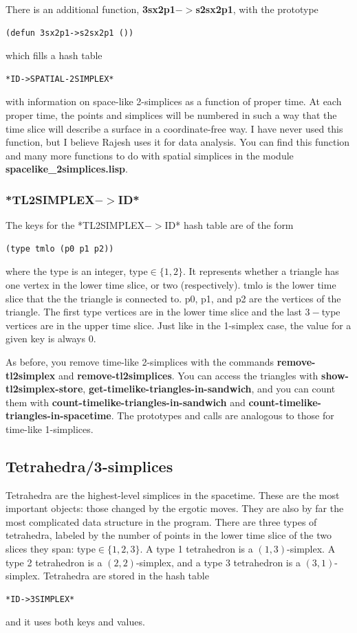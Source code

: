 \message{ !name(programmers_guide.tex)}\documentclass[12pt]{article}
\begin{document}
There is an additional function, \textbf{3sx2p1$->$s2sx2p1}, with the
prototype
\begin{lstlisting}
(defun 3sx2p1->s2sx2p1 ())
\end{lstlisting}
which fills a hash table
\begin{lstlisting}
*ID->SPATIAL-2SIMPLEX*
\end{lstlisting}
with information on space-like 2-simplices as a function of proper
time. At each proper time, the points and simplices will be numbered
in such a way that the time slice will describe a surface in a
coordinate-free way. I have never used this function, but I believe
Rajesh uses it for data analysis. You can find this function and many
more functions to do with spatial simplices in the module
\textbf{spacelike\_2simplices.lisp}.


\subsubsection{*TL2SIMPLEX$->$ID*}
The keys for the *TL2SIMPLEX$->$ID* hash table are of the form
\begin{lstlisting}
(type tmlo (p0 p1 p2))
\end{lstlisting}
where the type is an integer, type$\in\{1,2\}$. It represents whether
a triangle has one vertex in the lower time slice, or two
(respectively). tmlo is the lower time slice that the the triangle is
connected to. p0, p1, and p2 are the vertices of the triangle. The
first type vertices are in the lower time slice and the last $3-$type
vertices are in the upper time slice. Just like in the 1-simplex case,
the value for a given key is always 0.

As before, you remove time-like 2-simplices with the commands
\textbf{remove-tl2simplex} and \textbf{remove-tl2simplices}. You can
access the triangles with \textbf{show-tl2simplex-store},
\textbf{get-timelike-triangles-in-sandwich}, and you can count them
with \textbf{count-timelike-triangles-in-sandwich} and
\textbf{count-timelike-triangles-in-spacetime}. The prototypes and
calls are analogous to those for time-like 1-simplices.

\subsection{Tetrahedra/3-simplices}
Tetrahedra are the highest-level simplices in the spacetime. These are
the most important objects: those changed by the ergotic moves. They
are also by far the most complicated data structure in the
program. There are three types of tetrahedra, labeled by the number of
points in the lower time slice of the two slices they span:
type$\in\{1,2,3\}$. A type 1 tetrahedron is a $(1,3)$-simplex. A type
2 tetrahedron is a $(2,2)$-simplex, and a type 3 tetrahedron is a
$(3,1)$-simplex. Tetrahedra are stored in the hash table
\begin{lstlisting}
*ID->3SIMPLEX*
\end{lstlisting}
and it uses both keys and values.
\end{document}
